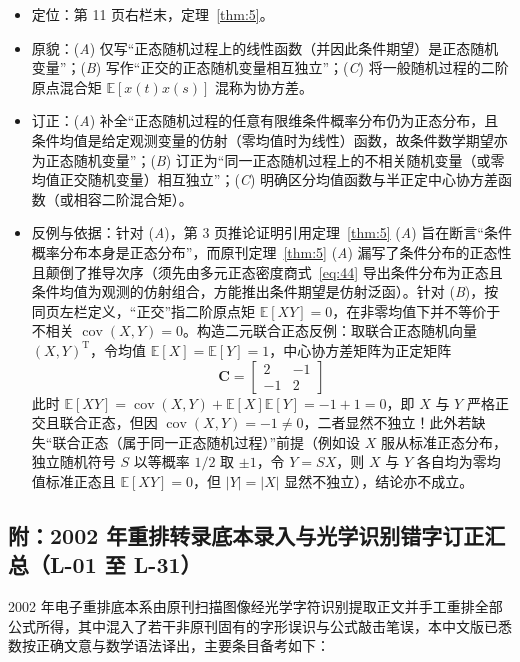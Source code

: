 \begin{itemize}
\item 定位：第 11 页右栏末，定理~\ref{thm:5}。
\item 原貌：(\emph{A}) 仅写“正态随机过程上的线性函数（并因此条件期望）是正态随机变量”；(\emph{B}) 写作“正交的正态随机变量相互独立”；(\emph{C}) 将一般随机过程的二阶原点混合矩 $\mathbb{E}[x(t)x(s)]$ 混称为协方差。
\item 订正：(\emph{A}) 补全“正态随机过程的任意有限维条件概率分布仍为正态分布，且条件均值是给定观测变量的仿射（零均值时为线性）函数，故条件数学期望亦为正态随机变量”；(\emph{B}) 订正为“同一正态随机过程上的不相关随机变量（或零均值正交随机变量）相互独立”；(\emph{C}) 明确区分均值函数与半正定中心协方差函数（或相容二阶混合矩）。
\item 反例与依据：针对 (\emph{A})，第 3 页推论证明引用定理~\ref{thm:5} (\emph{A}) 旨在断言“条件概率分布本身是正态分布”，而原刊定理~\ref{thm:5} (\emph{A}) 漏写了条件分布的正态性且颠倒了推导次序（须先由多元正态密度商式~\eqref{eq:44} 导出条件分布为正态且条件均值为观测的仿射组合，方能推出条件期望是仿射泛函）。针对 (\emph{B})，按同页左栏定义，“正交”指二阶原点矩 $\mathbb{E}[XY] = 0$，在非零均值下并不等价于不相关 $\operatorname{cov}(X, Y) = 0$。构造二元联合正态反例：取联合正态随机向量 $(X, Y)^{\mathrm{T}}$，令均值 $\mathbb{E}[X] = \mathbb{E}[Y] = 1$，中心协方差矩阵为正定矩阵
\begin{equation*}
\bm{C} = \begin{bmatrix} 2 & -1 \\ -1 & 2 \end{bmatrix}
\end{equation*}
此时 $\mathbb{E}[XY] = \operatorname{cov}(X, Y) + \mathbb{E}[X]\mathbb{E}[Y] = -1 + 1 = 0$，即 $X$ 与 $Y$ 严格正交且联合正态，但因 $\operatorname{cov}(X, Y) = -1 \neq 0$，二者显然不独立！此外若缺失“联合正态（属于同一正态随机过程）”前提（例如设 $X$ 服从标准正态分布，独立随机符号 $S$ 以等概率 $1/2$ 取 $\pm 1$，令 $Y = SX$，则 $X$ 与 $Y$ 各自均为零均值标准正态且 $\mathbb{E}[XY] = 0$，但 $|Y| = |X|$ 显然不独立），结论亦不成立。
\end{itemize}

\subsection{附：2002 年重排转录底本录入与光学识别错字订正汇总（L-01 至 L-31）}\label{sec:l-all}

2002 年电子重排底本系由原刊扫描图像经光学字符识别提取正文并手工重排全部公式所得，其中混入了若干非原刊固有的字形误识与公式敲击笔误，本中文版已悉数按正确文意与数学语法译出，主要条目备考如下：

